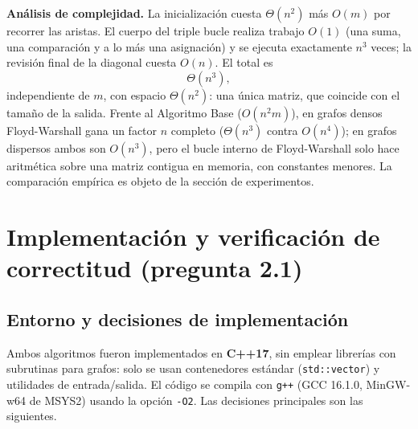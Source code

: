 \documentclass[11pt]{article}
\begin{document}
\textbf{Análisis de complejidad.} La inicialización cuesta $\Theta(n^2)$
más $O(m)$ por recorrer las aristas. El cuerpo del triple bucle realiza
trabajo $O(1)$ (una suma, una comparación y a lo más una asignación) y se
ejecuta exactamente $n^3$ veces; la revisión final de la diagonal cuesta
$O(n)$. El total es
\[
\Theta(n^3),
\]
independiente de $m$, con espacio $\Theta(n^2)$: una única matriz, que
coincide con el tamaño de la salida. Frente al Algoritmo Base ($O(n^2m)$),
en grafos densos Floyd-Warshall gana un factor $n$ completo ($\Theta(n^3)$
contra $O(n^4)$); en grafos dispersos ambos son $O(n^3)$, pero el bucle
interno de Floyd-Warshall solo hace aritmética sobre una matriz contigua en
memoria, con constantes menores. La comparación empírica es objeto de la
sección de experimentos.

\section{Implementación y verificación de correctitud (pregunta 2.1)}
\label{sec:implementacion}

\subsection{Entorno y decisiones de implementación}

Ambos algoritmos fueron implementados en \textbf{C++17}, sin emplear
librerías con subrutinas para grafos: solo se usan contenedores estándar
(\texttt{std::vector}) y utilidades de entrada/salida. El código se compila
con \texttt{g++} (GCC 16.1.0, MinGW-w64 de MSYS2) usando la opción
\texttt{-O2}. Las decisiones principales son las siguientes.
\end{document}
